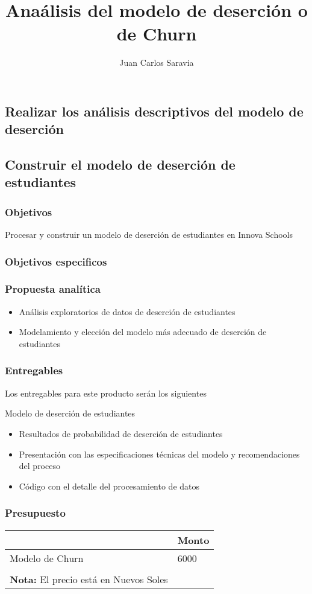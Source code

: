 \documentclass{beamer}
\title{Anaálisis del modelo de deserción o de Churn}
\author{Juan Carlos Saravia}
\date{}
\begin{document}
\begin{frame}
\titlepage
\end{frame}


\subsection{Realizar los análisis descriptivos del modelo de deserción}
\subsection{Construir el modelo de deserción de estudiantes}


\begin{frame}
\frametitle{Objetivos}
Procesar y construir un modelo de deserción de estudiantes en Innova Schools
\end{frame}



\begin{frame}
\frametitle{Objetivos especificos}
\tableofcontents
\end{frame}

\begin{frame}
\frametitle{Propuesta analítica}

\begin{itemize}
\item Análisis exploratorios de datos de deserción de estudiantes
\item Modelamiento y elección del modelo más adecuado de deserción de estudiantes
\end{itemize}	

\end{frame}

\begin{frame}
\frametitle{Entregables}

Los entregables para este producto serán los siguientes 

\begin{block}{Modelo de deserción de estudiantes}
\begin{itemize}
\item Resultados de probabilidad de deserción de estudiantes
\item Presentación con las especificaciones técnicas del modelo y recomendaciones del proceso
\item Código con el detalle del procesamiento de datos
\end{itemize}
\end{block}
\end{frame}

\begin{frame}
\frametitle{Presupuesto}
\begin{table}[ht]
\begin{tabular}{ll}
\hline
                       & Monto \\ \hline
Modelo de Churn & 6000  \\ \hline 
\\

\textbf{Nota:} El precio está en \alert{Nuevos Soles}
\end{tabular}
\end{table}





\end{frame}
\end{document}
